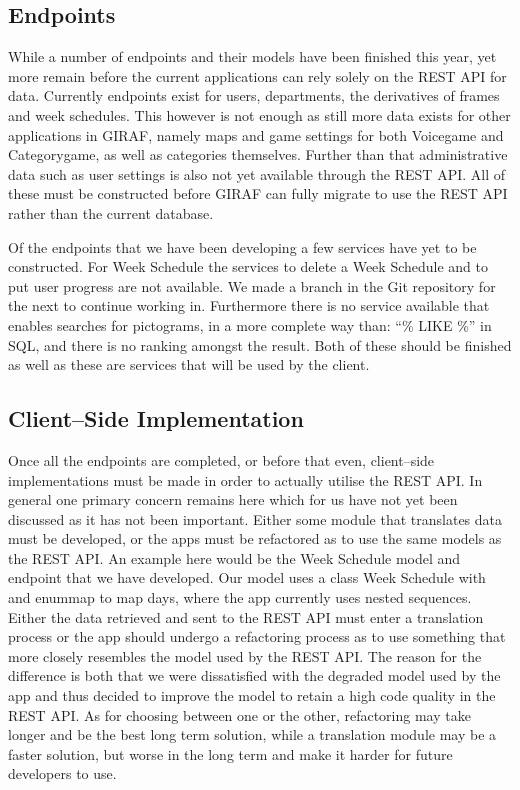 \subsection{Endpoints}
While a number of endpoints and their models have been finished this year, yet more remain before the current applications can rely solely on the REST API for data.
Currently endpoints exist for users, departments, the derivatives of frames and week schedules.
This however is not enough as still more data exists for other applications in GIRAF, namely maps and game settings for both Voicegame and Categorygame, as well as categories themselves.
Further than that administrative data such as user settings is also not yet available through the REST API.
All of these must be constructed before GIRAF can fully migrate to use the REST API rather than the current database.

Of the endpoints that we have been developing a few services have yet to be constructed.
For Week Schedule the services to delete a Week Schedule and to put user progress are not available.
We made a branch in the Git repository for the next to continue working in.
Furthermore there is no service available that enables searches for pictograms, in a more complete way than: ``\% LIKE \%'' in SQL, and there is no ranking amongst the result.
Both of these should be finished as well as these are services that will be used by the client.

\subsection{Client--Side Implementation}
Once all the endpoints are completed, or before that even, client--side implementations must be made in order to actually utilise the REST API.
In general one primary concern remains here which for us have not yet been discussed as it has not been important.
Either some module that translates data must be developed, or the apps must be refactored as to use the same models as the REST API.
An example here would be the Week Schedule model and endpoint that we have developed.
Our model uses a class Week Schedule with and enummap to map days, where the app currently uses nested sequences.
Either the data retrieved and sent to the REST API must enter a translation process or the app should undergo a refactoring process as to use something that more closely resembles the model used by the REST API.
The reason for the difference is both that we were dissatisfied with the degraded model used by the app and thus decided to improve the model to retain a high code quality in the REST API.
As for choosing between one or the other, refactoring may take longer and be the best long term solution, while a translation module may be a faster solution, but worse in the long term and make it harder for future developers to use.

